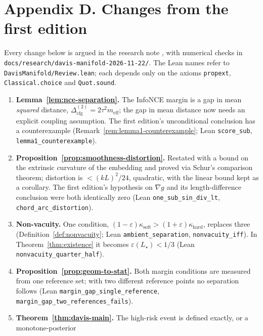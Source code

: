 \documentclass[11pt]{article}
\theoremstyle{remark}
\theoremstyle{plain}
\begin{document}
\begin{sloppypar}
\section*{Appendix D. Changes from the first edition}

Every change below is argued in the research note \cite{review2026}, with numerical checks in
\nolinkurl{docs/research/davis-manifold-2026-11-22/}. The Lean names refer to
\nolinkurl{DavisManifold/Review.lean}; each depends only on the axioms \texttt{propext}, \texttt{Classical.choice} and
\texttt{Quot.sound}.

\begin{enumerate}[label=D\arabic*.]
  \item \textbf{Lemma~\ref{lem:nce-separation}.} The InfoNCE margin is a gap in mean \emph{squared} distance,
    $\Delta^{(2)}_{\mathrm{cfg}} = 2\tau^2 m_{\mathrm{eff}}$; the gap in mean distance now needs an explicit coupling
    assumption. The first edition's unconditional conclusion has a counterexample
    (Remark~\ref{rem:lemma1-counterexample}; Lean \texttt{score\_sub}, \texttt{lemma1\_counterexample}).
  \item \textbf{Proposition~\ref{prop:smoothness-distortion}.} Restated with a bound on the extrinsic curvature of the
    embedding and proved via Schur's comparison theorem; distortion is $< (kL)^2/24$, quadratic, with the linear
    bound kept as a corollary. The first edition's hypothesis on $\nabla g$ and its length-difference conclusion
    were both identically zero (Lean \texttt{one\_sub\_sin\_div\_lt}, \texttt{chord\_arc\_distortion}).
  \item \textbf{Non-vacuity.} One condition, $(1-\varepsilon)\kappa_{\mathrm{soft}} > (1+\varepsilon)\kappa_{\mathrm{hard}}$,
    replaces three (Definition~\ref{def:nonvacuity}; Lean \texttt{ambient\_separation}, \texttt{nonvacuity\_iff}). In
    Theorem~\ref{thm:existence} it becomes $\varepsilon(L_\star) < 1/3$ (Lean \texttt{nonvacuity\_quarter\_half}).
  \item \textbf{Proposition~\ref{prop:geom-to-stat}.} Both margin conditions are measured from one reference set;
    with two different reference points no separation follows (Lean \texttt{margin\_gap\_single\_reference},
    \texttt{margin\_gap\_two\_references\_fails}).
  \item \textbf{Theorem~\ref{thm:davis-main}.} The high-risk event is defined exactly, or a monotone-posterior

\end{enumerate}
\end{sloppypar}
\end{document}
